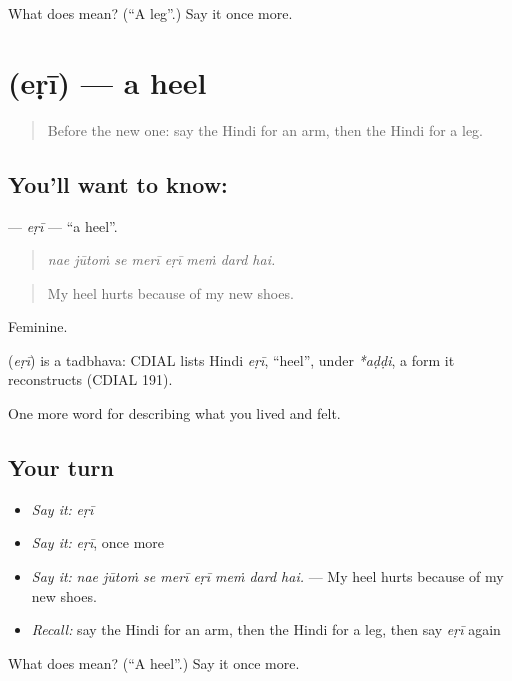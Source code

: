 \begin{tcolorbox}[breakable,colback=teal!4,colframe=teal!35!black,title={Before you move on}]
What does  mean? (\textquotedblleft{}A leg\textquotedblright{}.) Say it once more.
\end{tcolorbox}
\section[\texorpdfstring{\hi{एड़ी} (eṛī)}{एड़ी (eṛī)}]{ (eṛī) — a heel}

\label{lesson:HI-C477-eri}



\begin{quote}
Before the new one: say the Hindi for an arm, then the Hindi for a leg.
\end{quote}

\subsection*{You'll want to know: }
\textbf{} — \emph{eṛī} — \textquotedblleft{}a heel\textquotedblright{}.

\begin{quote}
       
\end{quote}

\begin{quote}
\emph{nae jūtoṁ se merī eṛī meṁ dard hai.}
\end{quote}

\begin{quote}
My heel hurts because of my new shoes.
\end{quote}

Feminine.

\begin{cousinweb}
\textbf{} (\emph{eṛī}) is a tadbhava: CDIAL lists Hindi \emph{eṛī}, \textquotedblleft{}heel\textquotedblright{}, under \emph{*aḍḍi}, a form it reconstructs (CDIAL 191).
\end{cousinweb}

\begin{grammarlens}[title={What you've built}]
One more word for describing what you lived and felt.
\end{grammarlens}

\subsection*{Your turn}
\begin{itemize}
\raggedright
  \item \emph{Say it:} \emph{eṛī}
  \item \emph{Say it:} \emph{eṛī}, once more
  \item \emph{Say it:} \emph{nae jūtoṁ se merī eṛī meṁ dard hai.} — My heel hurts because of my new shoes.
  \item \emph{Recall:} say the Hindi for an arm, then the Hindi for a leg, then say \emph{eṛī} again
\end{itemize}

\begin{tcolorbox}[breakable,colback=teal!4,colframe=teal!35!black,title={Before you move on}]
What does  mean? (\textquotedblleft{}A heel\textquotedblright{}.) Say it once more.
\end{tcolorbox}

